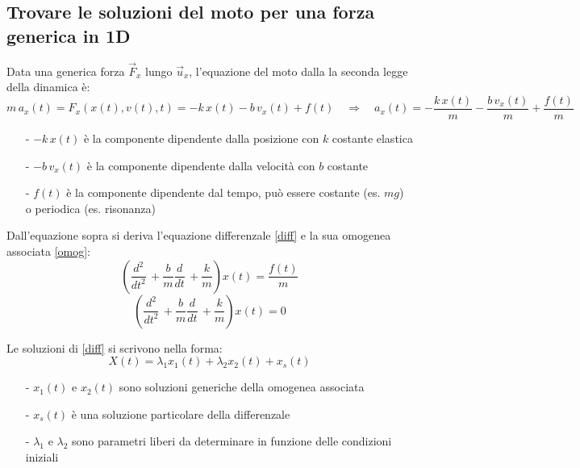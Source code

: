 \documentclass[a4paper]{article}
\newcommand\ux{\vec{u}_x}
\newcommand\dt{\frac{d}{dt}\,}
\newcommand\dts{\frac{d^2}{dt^2}\,}
\begin{document}
\subsection{Trovare le soluzioni del moto per una forza generica in 1D}
Data una generica forza \(\vec{F}_x\) lungo \(\ux\), l'equazione del moto dalla la seconda legge della dinamica è:
\[m \, a_x(t) = F_x(x(t), v(t), t) = -k \, x(t) - b \, v_x(t) + f(t) \quad \Rightarrow \quad a_x(t) = -\frac{k \, x(t)}{m} - \frac{b \, v_x(t)}{m} + \frac{f(t)}{m}\]
\begin{itemize}[topsep=3pt, itemsep=0pt]
	\item[-] \(-k \, x(t)\) è la componente dipendente dalla posizione con \(k\) costante elastica
	\item[-] \(-b \, v_x(t)\) è la componente dipendente dalla velocità con \(b\) costante
	\item[-] \(f(t)\) è la componente dipendente dal tempo, può essere costante (es. \(mg\)) o periodica (es. risonanza)
\end{itemize}

Dall'equazione sopra si deriva l'equazione differenzale \eqref{diff} e la sua omogenea associata \eqref{omog}:
\begin{equation}
	\label{diff}
	\left(\dts + \frac{b}{m} \dt + \frac{k}{m}\right) x(t) = \frac{f(t)}{m}
\end{equation}
\begin{equation}
	\label{omog}
	\left(\dts + \frac{b}{m} \dt + \frac{k}{m}\right) x(t) = 0
\end{equation}

Le soluzioni di \eqref{diff} si scrivono nella forma:
\[X(t) = \lambda_1 x_1(t) + \lambda_2 x_2(t) + x_s(t)\]
\begin{itemize}[topsep=3pt, itemsep=0pt]
	\item[-] \(x_1(t)\) e \(x_2(t)\) sono soluzioni generiche della omogenea associata
	\item[-] \(x_s(t)\) è una soluzione particolare della differenzale
	\item[-] \(\lambda_1\) e \(\lambda_2\) sono parametri liberi da determinare in funzione delle condizioni iniziali
\end{itemize}

\newpage
\end{document}
